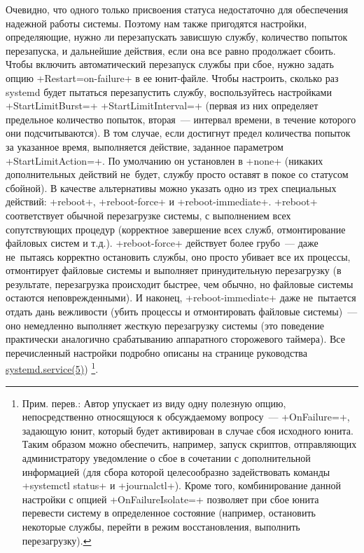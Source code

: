 \documentclass[10pt,oneside,a4paper]{article}
\begin{document}
Очевидно, что одного только присвоения статуса недостаточно для обеспечения
надежной работы системы. Поэтому нам также пригодятся настройки, определяющие,
нужно ли перезапускать зависшую службу, количество попыток перезапуска, и
дальнейшие действия, если она все равно продолжает сбоить. Чтобы включить
автоматический перезапуск службы при сбое, нужно задать опцию
+Restart=on-failure+ в ее юнит-файле. Чтобы настроить, сколько раз systemd будет
пытаться перезапустить службу, воспользуйтесь настройками +StartLimitBurst=+ 
+StartLimitInterval=+ (первая из них определяет предельное количество попыток,
вторая~--- интервал времени, в течение которого они подсчитываются). В том
случае, если достигнут предел количества попыток за указанное время, выполняется
действие, заданное параметром +StartLimitAction=+. По умолчанию он установлен в
+none+ (никаких дополнительных действий не~будет, службу просто оставят в покое со
статусом сбойной). В качестве альтернативы можно указать одно из трех
специальных действий: +reboot+, +reboot-force+ и +reboot-immediate+.
+reboot+ соответствует обычной перезагрузке системы, с выполнением всех
сопутствующих процедур (корректное завершение всех служб, отмонтирование
файловых систем и т.д.). +reboot-force+ действует более грубо~--- даже
не~пытаясь корректно остановить службы, оно просто убивает все их процессы,
отмонтирует файловые системы и выполняет принудительную перезагрузку (в
результате, перезагрузка происходит быстрее, чем обычно, но файловые системы
остаются неповрежденными). И наконец, +reboot-immediate+ даже не~пытается отдать
дань вежливости (убить процессы и отмонтировать файловые системы)~--- оно
немедленно выполняет жесткую перезагрузку системы (это поведение практически
аналогично срабатыванию аппаратного сторожевого таймера). Все перечисленный
настройки подробно описаны на странице руководства
\href{http://www.freedesktop.org/software/systemd/man/systemd.service.html}{systemd.service(5)})%
\footnote{Прим. перев.: Автор упускает из виду одну полезную опцию,
непосредственно относящуюся к обсуждаемому вопросу~--- +OnFailure=+, задающую
юнит, который будет активирован в случае сбоя исходного юнита. Таким образом
можно обеспечить, например, запуск скриптов, отправляющих администратору
уведомление о сбое в сочетании с дополнительной информацией (для сбора которой
целесообразно задействовать команды +systemctl status+ и +journalctl+). Кроме
того, комбинирование данной настройки с опцией +OnFailureIsolate=+ позволяет
при сбое юнита перевести систему в определенное состояние (например, остановить
некоторые службы, перейти в режим восстановления, выполнить перезагрузку).}.
\end{document}
